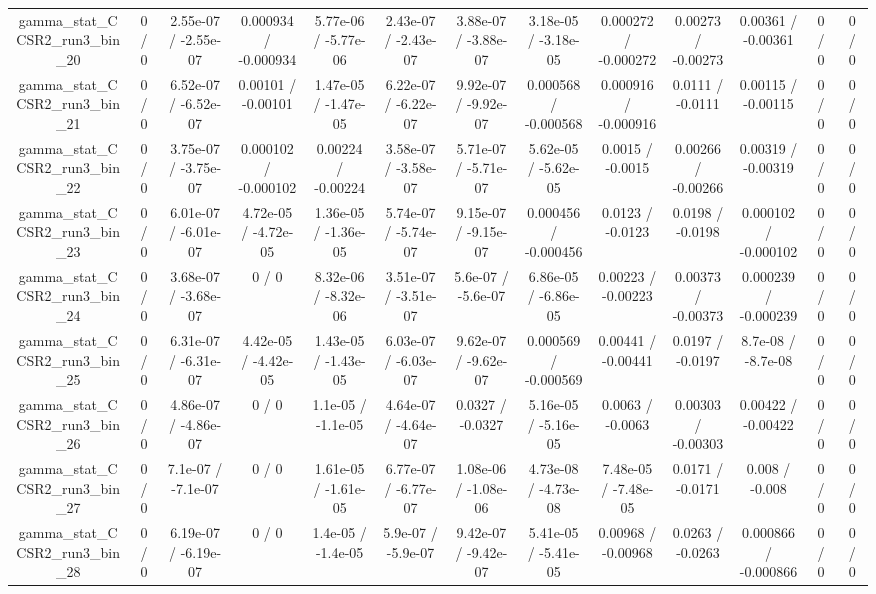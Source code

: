 \documentclass[10pt]{article}
\begin{document}
\begin{table}[htbp]
\begin{center}
\begin{tabular}{|c|c|c|c|c|c|c|c|c|c|c|c|c|}
  gamma_stat_CCSR2_run3_bin_20 & 0 / 0 & 2.55e-07 / -2.55e-07 & 0.000934 / -0.000934 & 5.77e-06 / -5.77e-06 & 2.43e-07 / -2.43e-07 & 3.88e-07 / -3.88e-07 & 3.18e-05 / -3.18e-05 & 0.000272 / -0.000272 & 0.00273 / -0.00273 & 0.00361 / -0.00361 & 0 / 0 & 0 / 0 \\ 
  gamma_stat_CCSR2_run3_bin_21 & 0 / 0 & 6.52e-07 / -6.52e-07 & 0.00101 / -0.00101 & 1.47e-05 / -1.47e-05 & 6.22e-07 / -6.22e-07 & 9.92e-07 / -9.92e-07 & 0.000568 / -0.000568 & 0.000916 / -0.000916 & 0.0111 / -0.0111 & 0.00115 / -0.00115 & 0 / 0 & 0 / 0 \\ 
  gamma_stat_CCSR2_run3_bin_22 & 0 / 0 & 3.75e-07 / -3.75e-07 & 0.000102 / -0.000102 & 0.00224 / -0.00224 & 3.58e-07 / -3.58e-07 & 5.71e-07 / -5.71e-07 & 5.62e-05 / -5.62e-05 & 0.0015 / -0.0015 & 0.00266 / -0.00266 & 0.00319 / -0.00319 & 0 / 0 & 0 / 0 \\ 
  gamma_stat_CCSR2_run3_bin_23 & 0 / 0 & 6.01e-07 / -6.01e-07 & 4.72e-05 / -4.72e-05 & 1.36e-05 / -1.36e-05 & 5.74e-07 / -5.74e-07 & 9.15e-07 / -9.15e-07 & 0.000456 / -0.000456 & 0.0123 / -0.0123 & 0.0198 / -0.0198 & 0.000102 / -0.000102 & 0 / 0 & 0 / 0 \\ 
  gamma_stat_CCSR2_run3_bin_24 & 0 / 0 & 3.68e-07 / -3.68e-07 & 0 / 0 & 8.32e-06 / -8.32e-06 & 3.51e-07 / -3.51e-07 & 5.6e-07 / -5.6e-07 & 6.86e-05 / -6.86e-05 & 0.00223 / -0.00223 & 0.00373 / -0.00373 & 0.000239 / -0.000239 & 0 / 0 & 0 / 0 \\ 
  gamma_stat_CCSR2_run3_bin_25 & 0 / 0 & 6.31e-07 / -6.31e-07 & 4.42e-05 / -4.42e-05 & 1.43e-05 / -1.43e-05 & 6.03e-07 / -6.03e-07 & 9.62e-07 / -9.62e-07 & 0.000569 / -0.000569 & 0.00441 / -0.00441 & 0.0197 / -0.0197 & 8.7e-08 / -8.7e-08 & 0 / 0 & 0 / 0 \\ 
  gamma_stat_CCSR2_run3_bin_26 & 0 / 0 & 4.86e-07 / -4.86e-07 & 0 / 0 & 1.1e-05 / -1.1e-05 & 4.64e-07 / -4.64e-07 & 0.0327 / -0.0327 & 5.16e-05 / -5.16e-05 & 0.0063 / -0.0063 & 0.00303 / -0.00303 & 0.00422 / -0.00422 & 0 / 0 & 0 / 0 \\ 
  gamma_stat_CCSR2_run3_bin_27 & 0 / 0 & 7.1e-07 / -7.1e-07 & 0 / 0 & 1.61e-05 / -1.61e-05 & 6.77e-07 / -6.77e-07 & 1.08e-06 / -1.08e-06 & 4.73e-08 / -4.73e-08 & 7.48e-05 / -7.48e-05 & 0.0171 / -0.0171 & 0.008 / -0.008 & 0 / 0 & 0 / 0 \\ 
  gamma_stat_CCSR2_run3_bin_28 & 0 / 0 & 6.19e-07 / -6.19e-07 & 0 / 0 & 1.4e-05 / -1.4e-05 & 5.9e-07 / -5.9e-07 & 9.42e-07 / -9.42e-07 & 5.41e-05 / -5.41e-05 & 0.00968 / -0.00968 & 0.0263 / -0.0263 & 0.000866 / -0.000866 & 0 / 0 & 0 / 0 \\ 

\end{tabular}
\end{center}
\end{table}
\end{document}
